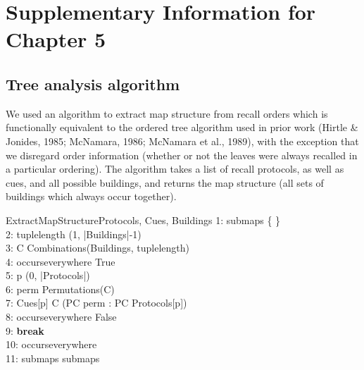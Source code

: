 %
%

\chapter{Supplementary Information for Chapter 5}
\label{apx:mapstruture}

\section{Tree analysis algorithm}

We used an algorithm to extract map structure from recall orders which is functionally equivalent to the ordered tree algorithm used in prior work (Hirtle \& Jonides, 1985; McNamara, 1986; McNamara et al., 1989), with the exception that we disregard order information (whether or not the leaves were always recalled in a particular ordering). The algorithm takes a list of recall protocols, as well as cues, and all possible buildings, and returns the map structure (all sets of buildings which always occur together).

\begin{pseudocode}[ruled]{ExtractMapStructure}{Protocols, Cues, Buildings}
	1: submaps \GETS \{ \} \\
	2: \FOREACH tuplelength \in (1, |Buildings|-1) \\
	3: \quad \FOREACH C \in Combinations(Buildings, tuplelength) \\
	4: \quad\quad occurseverywhere \GETS True \\
	5: \quad\quad \FOREACH p \in (0, |Protocols|) \\
	6: \quad\quad\quad perm \GETS Permutations(C) \\
	7: \quad\quad\quad \IF Cues[p] \notin C \AND \forall (PC \in perm : PC \notin Protocols[p]) \\
	8: \quad\quad\quad\quad occurseverywhere \GETS False \\
	9: \quad\quad\quad\quad \textbf{break} \\
	10: \quad\quad \IF occurseverywhere \\
	11: \quad\quad\quad submaps \GETS submaps 
\end{pseudocode}

